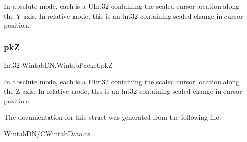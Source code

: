 In absolute mode, each is a U\+Int32 containing the scaled cursor location along the Y axis. In relative mode, this is an Int32 containing scaled change in cursor position. 

\mbox{\label{struct_wintab_d_n_1_1_wintab_packet_a7bfc56cd0228a44c13579ffa53196ac1}} 
\subsubsection{\texorpdfstring{pkZ}{pkZ}}
{\footnotesize\ttfamily Int32 Wintab\+D\+N.\+Wintab\+Packet.\+pkZ}



In absolute mode, each is a U\+Int32 containing the scaled cursor location along the Z axis. In relative mode, this is an Int32 containing scaled change in cursor position. 



The documentation for this struct was generated from the following file\+:\begin{DoxyCompactItemize}
\item 
Wintab\+D\+N/\mbox{\hyperlink{_c_wintab_data_8cs}{C\+Wintab\+Data.\+cs}}\end{DoxyCompactItemize}
